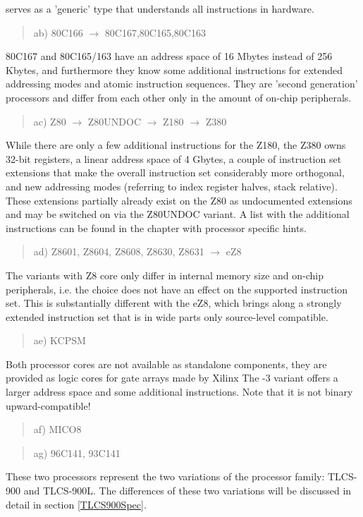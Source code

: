 \documentclass[12pt,twoside]{report}
\begin{document}
serves as a 'generic' type that understands all instructions in
hardware.
\begin{quote}
ab) 80C166 $\rightarrow$ 80C167,80C165,80C163
\end{quote}
80C167 and 80C165/163 have an address space of 16 Mbytes instead of 256
Kbytes, and furthermore they know some additional instructions for
extended addressing modes and atomic instruction sequences.  They are
'second generation' processors and differ from each other only in the
amount of on-chip peripherals.
\begin{quote}
ac) Z80 $\rightarrow$ Z80UNDOC $\rightarrow$ Z180 $\rightarrow$ Z380
\end{quote}
While there are only a few additional instructions for the Z180, the
Z380 owns 32-bit registers, a linear address space of 4 Gbytes, a
couple of instruction set extensions that make the overall
instruction set considerably more orthogonal, and new addressing
modes (referring to index register halves, stack relative).  These
extensions partially already exist on the Z80 as undocumented
extensions and may be switched on via the Z80UNDOC variant.  A list
with the additional instructions can be found in the chapter
with processor specific hints.
\begin{quote}
ad) Z8601, Z8604, Z8608, Z8630, Z8631 $\rightarrow$ eZ8
\end{quote}
The variants with Z8 core only differ in internal memory size and
on-chip peripherals, i.e. the choice does not have an effect on the
supported instruction set.  This is substantially different with the eZ8,
which brings along a strongly extended instruction set that is in wide
parts only source-level compatible.
\begin{quote}
ae) KCPSM
\end{quote}  
Both processor cores are not available as standalone components, they are
provided as logic cores for gate arrays made by Xilinx The -3 variant
offers a larger address space and some additional instructions.  Note that
it is not binary upward-compatible!
\begin{quote}
af) MICO8         
\end{quote}
\begin{quote}
ag) 96C141, 93C141
\end{quote}
These two processors represent the two variations of the processor 
family: TLCS-900 and TLCS-900L.  The differences of these two variations 
will be discussed in detail in section \ref{TLCS900Spec}.
\end{document}
